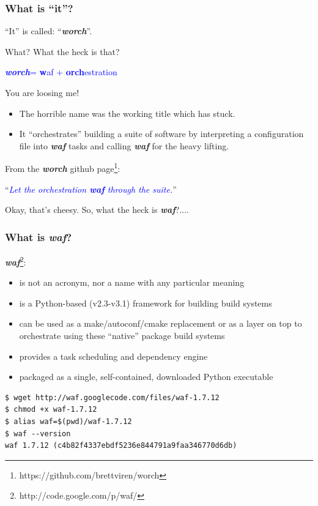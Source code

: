 \documentclass[xcolor=dvipsnames]{beamer}
\newcommand{\app}[1]{\textbf{\textit{#1}}\xspace}
\def\waf{\app{waf}}
\def\worch{\app{worch}}
\begin{document}
\begin{frame}
  \frametitle{What is ``\textbf{it}''?}
  ``It'' is called: ``\worch''.

  What?  What the heck is that?
  \begin{center}
    \textcolor{blue}{\worch = \textbf{w}af + \textbf{orch}estration}
  \end{center}

  You are loosing me!

  \begin{itemize}
  \item The horrible name was the working title which has stuck.
  \item It ``orchestrates'' building a suite of software by
    interpreting a configuration file into \waf tasks and calling \waf
    for the heavy lifting.
  \end{itemize}
  From the \worch github page\footnote{https://github.com/brettviren/worch}:
  \begin{center}
    ``\textcolor{blue}{\textit{Let the orchestration \waf through the suite.}}''
  \end{center}
  Okay, that's cheesy.  So, what the heck is \waf?....
\end{frame}

\begin{frame}[fragile]
  \frametitle{What is \waf?}

  \waf\footnote{http://code.google.com/p/waf/}:
  \begin{itemize}
  \item is not an acronym, nor a name with any particular meaning
  \item is a Python-based (v2.3-v3.1) framework for building build systems
  \item can be used as a make/autoconf/cmake replacement or as a layer
    on top to orchestrate using these ``native'' package build systems
  \item provides a task scheduling and dependency engine
  \item packaged as a single, self-contained, downloaded Python executable
  \end{itemize}
\begin{verbatim}
$ wget http://waf.googlecode.com/files/waf-1.7.12
$ chmod +x waf-1.7.12
$ alias waf=$(pwd)/waf-1.7.12
$ waf --version
waf 1.7.12 (c4b82f4337ebdf5236e844791a9faa346770d6db)
\end{verbatim}

\end{frame}
\end{document}
